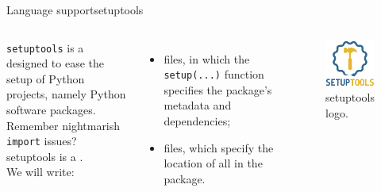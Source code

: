 \begin{frame}{Language support}{setuptools}
  \begin{columns}
    \texttt{setuptools} is a  designed to ease the setup of Python projects, namely Python software packages.\\
    Remember nightmarish \texttt{import} issues? setuptools is a .\\
    \bigskip
    We will write:
    \begin{itemize}
      \item {} files, in which the \texttt{setup(...)} function specifies the package's metadata and dependencies;
      \item {} files, which specify the location of all  in the package.
    \end{itemize}

    \begin{figure}
      \centering
      \includegraphics[width=.7\textwidth]{setuptools}
      \caption{setuptools logo.}
      \label{fig:setuptools}
    \end{figure}
  \end{columns}
\end{frame}
